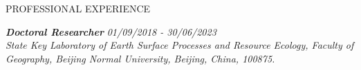 \documentclass{resume} %
\newcommand{\employmententry}[3]{\textbf{\textit{#1}} \hfill {\em #2} \\ \textnormal{\em #3}}
\begin{document}
\begin{rSection}{PROFESSIONAL EXPERIENCE}

\employmententry{Doctoral Researcher}{01/09/2018 - 30/06/2023}
{State Key Laboratory of Earth Surface Processes and Resource Ecology, Faculty of Geography, Beijing Normal University, Beijing, China, 100875.}



\end{rSection}
\end{document}
